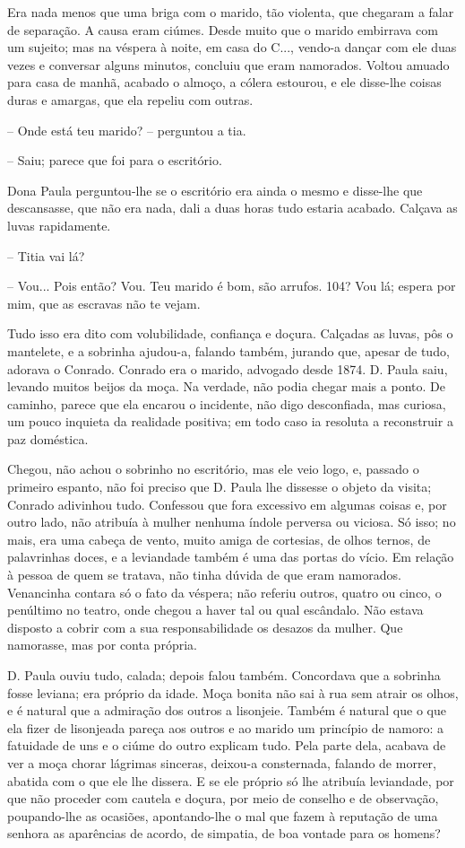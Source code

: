 Era nada menos que uma briga com o marido, tão violenta, que chegaram a
falar de separação. A causa eram ciúmes. Desde muito que o marido
embirrava com um sujeito; mas na véspera à noite, em casa do C...,
vendo-a dançar com ele duas vezes e conversar alguns minutos, concluiu
que eram namorados. Voltou amuado para casa de manhã, acabado o almoço,
a cólera estourou, e ele disse-lhe coisas duras e amargas, que ela
repeliu com outras.

-- Onde está teu marido? -- perguntou a tia.

-- Saiu; parece que foi para o escritório.

Dona Paula perguntou-lhe se o escritório era ainda o mesmo e disse-lhe
que descansasse, que não era nada, dali a duas horas tudo estaria
acabado. Calçava as luvas rapidamente.

-- Titia vai lá?

-- Vou... Pois então? Vou. Teu marido é bom, são arrufos. 104? Vou lá;
espera por mim, que as escravas não te vejam.

Tudo isso era dito com volubilidade, confiança e doçura. Calçadas as
luvas, pôs o mantelete, e a sobrinha ajudou-a, falando também, jurando
que, apesar de tudo, adorava o Conrado. Conrado era o marido, advogado
desde 1874. D. Paula saiu, levando muitos beijos da moça. Na verdade,
não podia chegar mais a ponto. De caminho, parece que ela encarou o
incidente, não digo desconfiada, mas curiosa, um pouco inquieta da
realidade positiva; em todo caso ia resoluta a reconstruir a paz
doméstica.

Chegou, não achou o sobrinho no escritório, mas ele veio logo, e,
passado o primeiro espanto, não foi preciso que D. Paula lhe dissesse o
objeto da visita; Conrado adivinhou tudo. Confessou que fora excessivo
em algumas coisas e, por outro lado, não atribuía à mulher nenhuma
índole perversa ou viciosa. Só isso; no mais, era uma cabeça de vento,
muito amiga de cortesias, de olhos ternos, de palavrinhas doces, e a
leviandade também é uma das portas do vício. Em relação à pessoa de quem
se tratava, não tinha dúvida de que eram namorados. Venancinha contara
só o fato da véspera; não referiu outros, quatro ou cinco, o penúltimo
no teatro, onde chegou a haver tal ou qual escândalo. Não estava
disposto a cobrir com a sua responsabilidade os desazos da mulher. Que
namorasse, mas por conta própria.

D. Paula ouviu tudo, calada; depois falou também. Concordava que a
sobrinha fosse leviana; era próprio da idade. Moça bonita não sai à rua
sem atrair os olhos, e é natural que a admiração dos outros a lisonjeie.
Também é natural que o que ela fizer de lisonjeada pareça aos outros e
ao marido um princípio de namoro: a fatuidade de uns e o ciúme do outro
explicam tudo. Pela parte dela, acabava de ver a moça chorar lágrimas
sinceras, deixou-a consternada, falando de morrer, abatida com o que ele
lhe dissera. E se ele próprio só lhe atribuía leviandade, por que não
proceder com cautela e doçura, por meio de conselho e de observação,
poupando-lhe as ocasiões, apontando-lhe o mal que fazem à reputação de
uma senhora as aparências de acordo, de simpatia, de boa vontade para os
homens?

